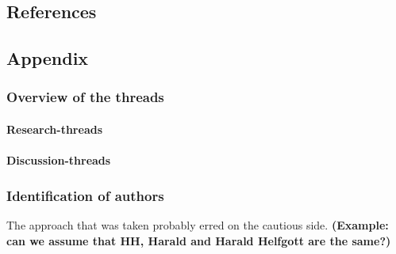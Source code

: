 \documentclass[article, floatfix, groupaddress, prb]{revtex4-1}
\begin{document}
    \subsection{References}\label{references}



    \subsection{Appendix}\label{appendix}

\subsubsection{Overview of the threads}\label{overview-of-the-threads}

\paragraph{Research-threads}\label{research-threads}


    \paragraph{Discussion-threads}\label{discussion-threads}


    \subsubsection{Identification of
authors}\label{identification-of-authors}

The approach that was taken probably erred on the cautious side.
\textbf{(Example: can we assume that HH, Harald and Harald Helfgott are
the same?)}




    
    
    
    
\end{document}
